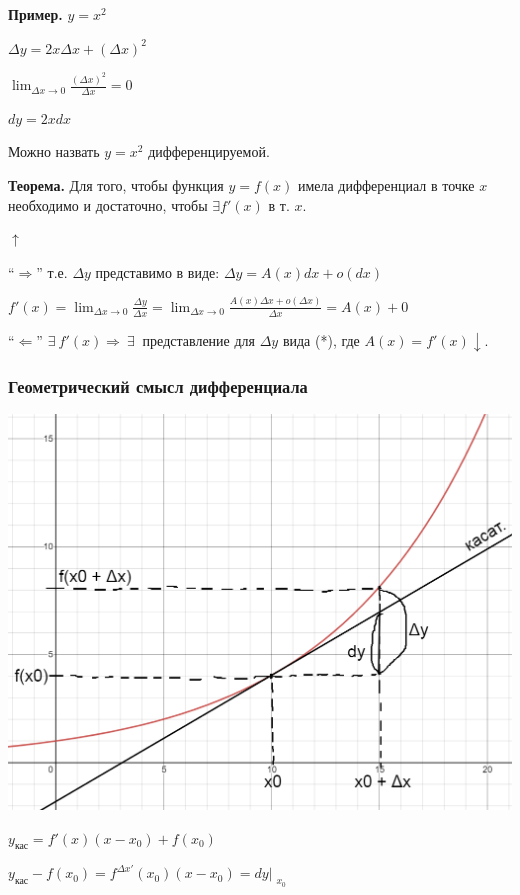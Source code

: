\documentclass{article}
\begin{document}
    \textbf{Пример.} \( y = x^2 \)

    \( \Delta y = 2x\Delta x + (\Delta x)^2 \)

    \( \lim_{\Delta x \to 0} \frac{(\Delta x)^2}{\Delta x} = 0 \)

    \( dy = 2xdx \)
    
    Можно назвать \( y = x^2 \) дифференцируемой.

    \textbf{Теорема.} Для того, чтобы функция \( y = f(x) \) имела дифференциал в точке \(x\) необходимо и достаточно, чтобы \(\exists f'(x)\) в т. \(x\).

    \(\uparrow\)

    ``\( \Rightarrow \)'' т.е. \( \Delta y \) представимо в виде: \( \Delta y = A(x)dx + o(dx) \)

    \(f'(x) = \lim_{\Delta x \to 0}\frac{\Delta y}{\Delta x} = \lim_{\Delta x \to 0}\frac{A(x)\Delta x + o(\Delta x)}{\Delta x} = A(x) + 0 \)

    ``\( \Leftarrow \)'' \(\exists\ f'(x) \Rightarrow\ \exists\ \) представление для \(\Delta y\) вида (*), где \(A(x) = f'(x) \downarrow\).

    \subsubsection{Геометрический смысл дифференциала}

    \includegraphics[scale=0.3]{11_1_9_2.png}

    \( y_{\textrm{кас}} = f'(x)(x - x_0) + f(x_0) \)

    \( y_{\textrm{кас}} - f(x_0) = f^{\Delta x'}(x_0)(x - x_0) = dy\Bigr|_{\substack{x_0}} \)
\end{document}
